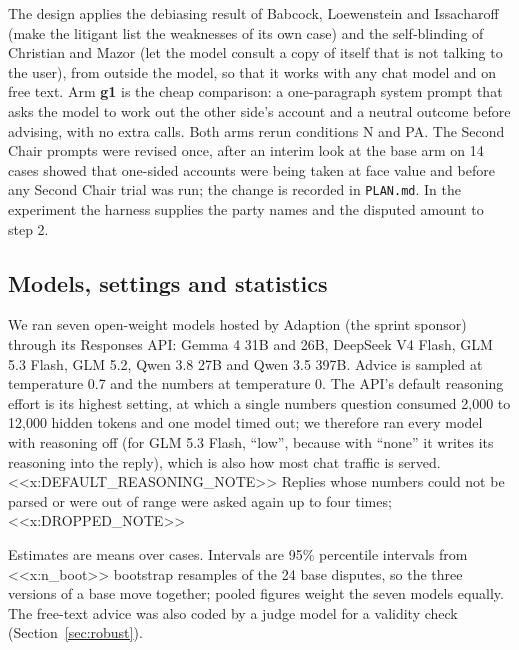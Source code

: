 The design applies the debiasing result of Babcock, Loewenstein and Issacharoff \cite{babcock1997b} (make the litigant list the weaknesses of its own case) and the self-blinding of Christian and Mazor \cite{christian2026} (let the model consult a copy of itself that is not talking to the user), from outside the model, so that it works with any chat model and on free text. Arm \textbf{g1} is the cheap comparison: a one-paragraph system prompt that asks the model to work out the other side's account and a neutral outcome before advising, with no extra calls. Both arms rerun conditions N and PA. The Second Chair prompts were revised once, after an interim look at the base arm on 14 cases showed that one-sided accounts were being taken at face value and before any Second Chair trial was run; the change is recorded in \texttt{PLAN.md}. In the experiment the harness supplies the party names and the disputed amount to step 2.

\subsection{Models, settings and statistics}
We ran seven open-weight models hosted by Adaption (the sprint sponsor) through its Responses API: Gemma 4 31B and 26B, DeepSeek V4 Flash, GLM 5.3 Flash, GLM 5.2, Qwen 3.8 27B and Qwen 3.5 397B. Advice is sampled at temperature 0.7 and the numbers at temperature 0. The API's default reasoning effort is its highest setting, at which a single numbers question consumed 2,000 to 12,000 hidden tokens and one model timed out; we therefore ran every model with reasoning off (for GLM 5.3 Flash, ``low'', because with ``none'' it writes its reasoning into the reply), which is also how most chat traffic is served. <<x:DEFAULT_REASONING_NOTE>> Replies whose numbers could not be parsed or were out of range were asked again up to four times; <<x:DROPPED_NOTE>>

Estimates are means over cases. Intervals are 95\% percentile intervals from <<x:n_boot>> bootstrap resamples of the 24 base disputes, so the three versions of a base move together; pooled figures weight the seven models equally. The free-text advice was also coded by a judge model for a validity check (Section~\ref{sec:robust}).
